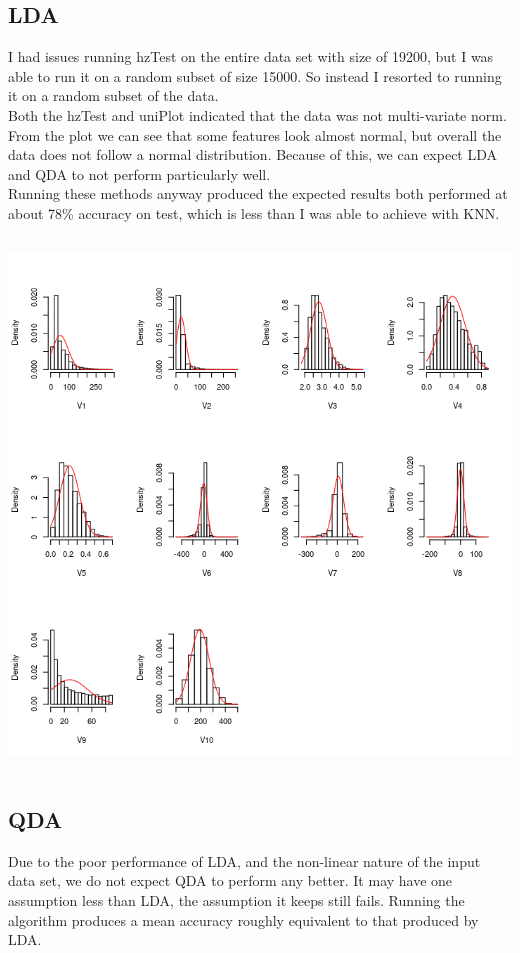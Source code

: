 \documentclass{jhwhw}
\begin{document}
    \subsection*{LDA}
    I had issues running hzTest on the entire data set with size of 19200, but I was 
    able to run it on a random subset of size 15000.
    So instead I resorted to running it on a random subset of the data. \\
    Both the hzTest and uniPlot indicated that the data was not multi-variate norm.
    From the plot we can see that some features look almost normal, but overall the data
    does not follow a normal distribution. Because of this, we can expect LDA and QDA to
    not perform particularly well. \\
    Running these methods anyway produced the expected results both performed at about 
    78\% accuracy on test, which is less than I was able to achieve with KNN. \\
    \bigbreak
    \inputminted[frame=lines,framesep=2mm]{text}{norm.txt}
    \bigbreak
    \begin{center}
	\includegraphics[scale=0.5]{hist}
    \end{center}
    \inputminted[linenos,frame=lines,framesep=2mm]{R}{lda.R}

    \subsection*{QDA}
    Due to the poor performance of LDA, and the non-linear nature of the input data set,
    we do not expect QDA to perform any better.
    It may have one assumption less than LDA, the assumption it keeps still fails.
    Running the algorithm produces a mean accuracy roughly equivalent to that 
    produced by LDA. \\
    \inputminted[linenos,frame=lines,framesep=2mm]{R}{qda.R}
\end{document}

